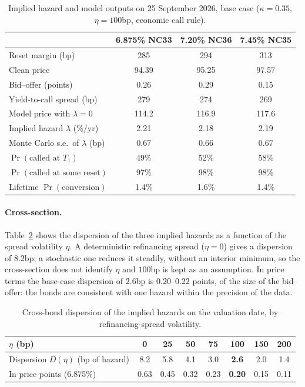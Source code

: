 \begin{table}[H]
\centering
\begin{tabular}{lccc}
\toprule
 & 6.875\% NC33 & 7.20\% NC36 & 7.45\% NC35 \\
\midrule
Reset margin (bp) & 285 & 294 & 313 \\
Clean price & 94.39 & 95.25 & 97.57 \\
Bid--offer (points) & 0.26 & 0.29 & 0.15 \\
Yield-to-call spread (bp) & 279 & 274 & 269 \\
Model price with $\lambda=0$ & 114.2 & 116.9 & 117.6 \\
Implied hazard $\lambda$ (\%/yr) & 2.21 & 2.18 & 2.19 \\
Monte Carlo s.e.\ of $\lambda$ (bp) & 0.67 & 0.66 & 0.67 \\
$\Pr(\text{called at }T_1)$ & 49\% & 52\% & 58\% \\
$\Pr(\text{called at some reset})$ & 97\% & 98\% & 98\% \\
Lifetime $\Pr(\text{conversion})$ & 1.4\% & 1.6\% & 1.4\% \\
\bottomrule
\end{tabular}
\caption{Implied hazard and model outputs on 25 September 2026, base case ($\kappa=0.35$,
$\eta=100$bp, economic call rule).}
\label{tab:implied}
\end{table}

\paragraph{Cross-section.} Table~\ref{tab:eta} shows the dispersion of the three implied
hazards as a function of the spread volatility $\eta$. A deterministic refinancing spread
($\eta=0$) gives a dispersion of $8.2$bp; a stochastic one reduces it steadily, without an
interior minimum, so the cross-section does not identify $\eta$ and $100$bp is kept as an
assumption. In price terms the base-case dispersion of $2.6$bp is $0.20$--$0.22$ points, of
the size of the bid--offer: the bonds are consistent with one hazard within the precision
of the data.

\begin{table}[H]
\centering
\begin{tabular}{lccccccc}
\toprule
$\eta$ (bp) & 0 & 25 & 50 & 75 & 100 & 150 & 200\\
\midrule
Dispersion $D(\eta)$ (bp of hazard) & 8.2 & 5.8 & 4.1 & 3.0 & \textbf{2.6} & 2.0 & 1.4\\
In price points (6.875\%) & 0.63 & 0.45 & 0.32 & 0.23 & \textbf{0.20} & 0.15 & 0.11\\
\bottomrule
\end{tabular}
\caption{Cross-bond dispersion of the implied hazards on the valuation date, by
refinancing-spread volatility.}
\label{tab:eta}
\end{table}

